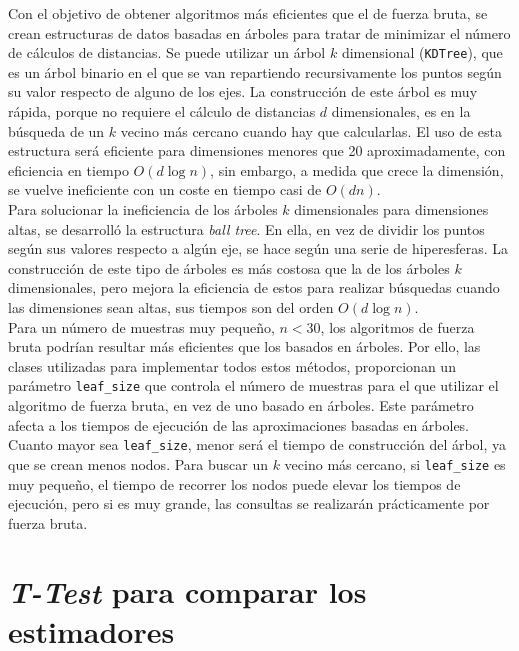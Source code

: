 \documentclass[12pt,a4paper]{report} %
\theoremstyle{definition}
\begin{document}
Con el objetivo de obtener algoritmos más eficientes que el de fuerza bruta, se crean estructuras de datos basadas en árboles para tratar de minimizar el número de cálculos de distancias. Se puede utilizar un árbol $k$ dimensional (\texttt{KDTree}), que es un árbol binario en el que se van repartiendo recursivamente los puntos según su valor respecto de alguno de los ejes. La construcción de este árbol es muy rápida, porque no requiere el cálculo de distancias $d$ dimensionales, es en la búsqueda de un $k$ vecino más cercano cuando hay que calcularlas. El uso de esta estructura será eficiente para dimensiones menores que 20 aproximadamente, con eficiencia en tiempo $O(d\log n)$, sin embargo, a medida que crece la dimensión, se vuelve ineficiente con un coste en tiempo casi de $O(dn)$.\\

Para solucionar la ineficiencia de los árboles $k$ dimensionales para dimensiones altas, se desarrolló la estructura \textit{ball tree}. En ella, en vez de dividir los puntos según sus valores respecto a algún eje, se hace según una serie de hiperesferas. La construcción de este tipo de árboles es más costosa que la de los árboles $k$ dimensionales, pero mejora la eficiencia de estos para realizar búsquedas cuando las dimensiones sean altas, sus tiempos son del orden $O(d\log n)$.\\

Para un número de muestras muy pequeño, $n<30$, los algoritmos de fuerza bruta podrían resultar más eficientes que los basados en árboles. Por ello, las clases utilizadas para implementar todos estos métodos, proporcionan un parámetro \texttt{leaf\_size} que controla el número de muestras para el que utilizar el algoritmo de fuerza bruta, en vez de uno basado en árboles. Este parámetro afecta a los tiempos de ejecución de las aproximaciones basadas en árboles. Cuanto mayor sea \texttt{leaf\_size}, menor será el tiempo de construcción del árbol, ya que se crean menos nodos. Para buscar un $k$ vecino más cercano, si \texttt{leaf\_size} es muy pequeño, el tiempo de recorrer los nodos puede elevar los tiempos de ejecución, pero si es muy grande, las consultas se realizarán prácticamente por fuerza bruta.\\

\section{\textit{T-Test} para comparar los estimadores}
\end{document}
